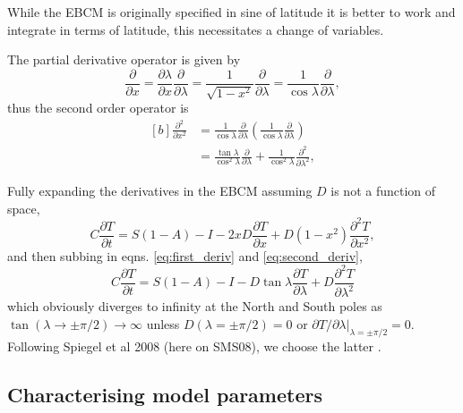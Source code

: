 \documentclass[12pt, onecolumn]{revtex4-2}    %
\begin{document}
While the EBCM is originally specified in sine of latitude it is better to work and integrate in terms of latitude, this necessitates a change of variables.

The partial derivative operator is given by
\begin{equation}
    \frac{\partial}{\partial x} = \frac{\partial \lambda}{\partial x} \frac {\partial} {\partial \lambda}
    = \frac{1}{\sqrt{1-x^2}} \frac {\partial} {\partial \lambda}
    = \frac{1}{\cos \lambda} \frac {\partial} {\partial \lambda},
    \label{eq:first_deriv}
\end{equation}
thus the second order operator is
\begin{equation}
    \begin{aligned}[b]
        \frac{\partial^2}{\partial x^2} & = \frac{1}{\cos\lambda} \frac{\partial}{\partial \lambda} \left( \frac{1}{\cos\lambda} \frac{\partial}{\partial \lambda} \right)      \\
                                        & = \frac{\tan\lambda}{\cos^2\lambda}\frac{\partial}{\partial \lambda} + \frac{1}{\cos^2\lambda} \frac{\partial^2}{\partial \lambda^2},
    \end{aligned}
    \label{eq:second_deriv}
\end{equation}

Fully expanding the derivatives in the EBCM assuming $D$ is not a function of space,
\begin{equation}
    C \frac{\partial T}{\partial t} = S(1-A) - I
    - 2 x D \frac{\partial T}{\partial x}
    + D (1-x^2) \frac{\partial^2 T}{\partial x^2},
    \label{eq:expanded}
\end{equation}
and then subbing in eqns. \eqref{eq:first_deriv} and \eqref{eq:second_deriv},
\begin{equation}
    C \frac{\partial T}{\partial t} = S(1-A) - I
    - D \tan\lambda \frac{\partial T}{\partial \lambda}
    + D \frac{\partial^2 T}{\partial \lambda^2}
    \label{eq:PDE_in_lat}
\end{equation}
which obviously diverges to infinity at the North and South poles as $\tan(\lambda \rightarrow \pm \pi/2) \rightarrow \infty$ unless $D(\lambda = \pm \pi/2) = 0$ or $\partial T / \partial \lambda|_{\lambda=\pm \pi/2} = 0$.
Following Spiegel et al 2008 (here on SMS08), we choose the latter \cite{SMS08}.

\subsection{Characterising model parameters} \label{ssec:model_params}
\end{document}
